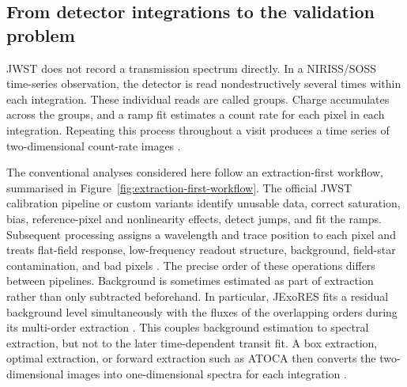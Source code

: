 \subsection{From detector integrations to the validation problem}
\label{sec:detector-to-validation}
\label{sec:detector-to-spectrum}
\label{sec:validation-problem}


JWST does not record a transmission spectrum directly. In a NIRISS/SOSS
time-series observation, the detector is read nondestructively several times
within each integration. These individual reads are called groups. Charge
accumulates across the groups, and a ramp fit estimates a count rate for each
pixel in each integration. Repeating this process throughout a visit produces a
time series of two-dimensional count-rate images
\citep{AlbertEtAl2023}.

The conventional analyses considered here follow an extraction-first workflow,
summarised in Figure~\ref{fig:extraction-first-workflow}. The official JWST
calibration pipeline or custom variants identify unusable data, correct
saturation, bias, reference-pixel and nonlinearity effects, detect jumps, and
fit the ramps. Subsequent processing assigns a wavelength and trace position to
each pixel and treats flat-field response, low-frequency readout structure,
background, field-star contamination, and bad pixels
\citep{BellEtAl2022,RadicaEtAl2023,LouieEtAl2025}. The precise order of these
operations differs between pipelines. Background is sometimes estimated as
part of extraction rather than only subtracted beforehand. In particular,
JExoRES fits a residual background level simultaneously with the fluxes of the
overlapping orders during its multi-order extraction
\citep{HolmbergMadhusudhan2023}. This couples background estimation to spectral
extraction, but not to the later time-dependent transit fit. A box extraction,
optimal extraction, or forward extraction such as ATOCA then converts the
two-dimensional images into one-dimensional spectra for each integration
\citep{Horne1986,DarveauBernierEtAl2022}.

